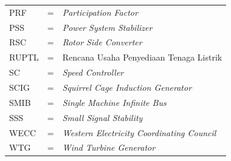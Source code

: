 \begin{tabular}{llp{3in}}
	PRF      & \hspace{1.5cm} = & \textit{Participation Factor} \\
	PSS      & \hspace{1.5cm} = & \textit{Power System Stabilizer} \\
	RSC      & \hspace{1.5cm} = & \textit{Rotor Side Converter} \\
	RUPTL    & \hspace{1.5cm} = & Rencana Usaha Penyediaan Tenaga Listrik \\
	SC       & \hspace{1.5cm} = & \textit{Speed Controller} \\
	SCIG     & \hspace{1.5cm} = & \textit{Squirrel Cage Induction Generator} \\
	SMIB     & \hspace{1.5cm} = & \textit{Single Machine Infinite Bus} \\
	SSS      & \hspace{1.5cm} = & \textit{Small Signal Stability} \\
	WECC     & \hspace{1.5cm} = & \textit{Western Electricity Coordinating Council} \\
	WTG      & \hspace{1.5cm} = & \textit{Wind Turbine Generator} \\
\end{tabular}
